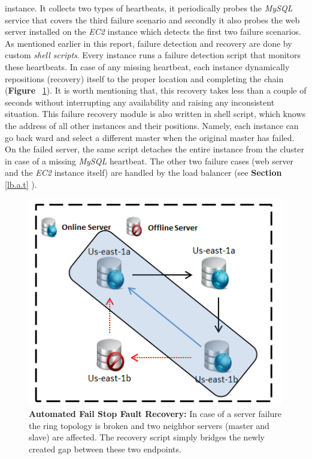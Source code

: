\documentclass[12pt]{article}
\begin{document}
instance. It collects two types of heartbeats, it periodically probes the
\emph{MySQL} service that covers the third failure scenario and secondly it also
probes the web server installed on the \emph{EC2} instance which detects the
first two failure scenarios. As mentioned earlier in this report, failure
detection and recovery are done by custom \emph{shell scripts}. Every instance
runs a failure detection script that monitors these heartbeats. In case of any
missing heartbeat, each instance dynamically repositions (recovery) itself to
the proper location and completing the chain (\textbf{Figure
}~\ref{fig:failurerecovery}). It is worth mentioning that, this recovery takes
less than a couple of seconds without interrupting any availability and raising
any inconsistent situation. This failure recovery module is also written in
shell script, which knows the address of all other instances and their
positions. Namely, each instance can go back ward and select a different master
when the original master has failed.  On the failed server, the same script
detaches the entire instance from the cluster in case of a missing \emph{MySQL}
heartbeat. The other two failure cases (web server and the \emph{EC2} instance
itself) are handled by the load balancer (see \textbf{Section} \ref{lb.a.t} ).
\begin{figure}[H]
\centering 
\includegraphics[scale=0.8]{Images/figure5.PNG}
\caption{\textbf{Automated Fail Stop Fault Recovery:} In case of a server
failure the ring topology is broken and two neighbor servers (master and slave)
are affected. The recovery script simply bridges the newly created gap between
these two endpoints.} 
\label{fig:failurerecovery} 
\end{figure} 
\end{document}
